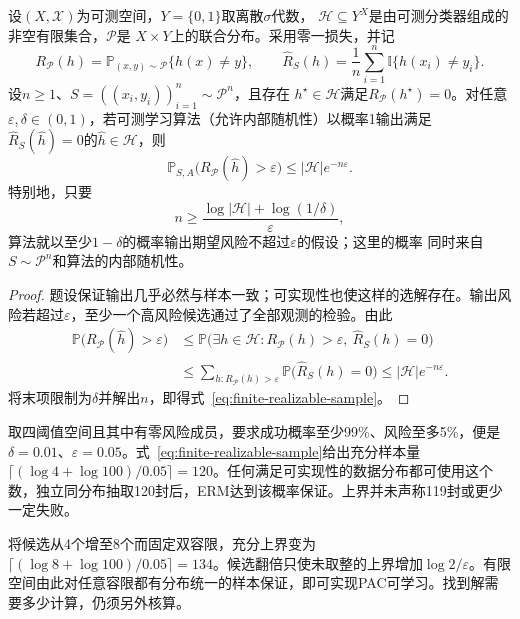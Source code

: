 \begin{theorem}[有限假设空间的可实现PAC样本量界]
\label{thm:finite-realizable-pac}
设$(X,\mathcal X)$为可测空间，$Y=\{0,1\}$取离散$\sigma$代数，
$\mathcal H\subseteq Y^X$是由可测分类器组成的非空有限集合，$\mathcal P$是
$X\times Y$上的联合分布。采用零一损失，并记
\[
 R_{\mathcal P}(h)=\mathbb P_{(x,y)\sim\mathcal P}\{h(x)\neq y\},\qquad
 \hat R_S(h)=\frac1n\sum_{i=1}^n\mathbb I\{h(x_i)\neq y_i\}.
\]
设$n\geq1$、$S=((x_i,y_i))_{i=1}^n\sim\mathcal P^n$，且存在
$h^\star\in\mathcal H$满足$R_{\mathcal P}(h^\star)=0$。对任意
$\varepsilon,\delta\in(0,1)$，若可测学习算法（允许内部随机性）以概率1输出满足
$\hat R_S(\hat h)=0$的$\hat h\in\mathcal H$，则
\begin{equation}
  \mathbb P_{S,A}\bigl(R_{\mathcal P}(\hat h)>\varepsilon\bigr)
  \leq |\mathcal H|e^{-n\varepsilon}.
  \label{eq:finite-realizable-failure}
\end{equation}
特别地，只要
\begin{equation}
  n\geq\frac{\log|\mathcal H|+\log(1/\delta)}{\varepsilon},
  \label{eq:finite-realizable-sample}
\end{equation}
算法就以至少$1-\delta$的概率输出期望风险不超过$\varepsilon$的假设；这里的概率
同时来自$S\sim\mathcal P^n$和算法的内部随机性。
\end{theorem}

\begin{proof}
题设保证输出几乎必然与样本一致；可实现性也使这样的选解存在。输出风险若超过$\varepsilon$，至少一个高风险候选通过了全部观测的检验。由此
\begin{align*}
 \mathbb P\bigl(R_{\mathcal P}(\hat h)>\varepsilon\bigr)
 &\leq \mathbb P\bigl(\exists h\in\mathcal H:
       R_{\mathcal P}(h)>\varepsilon,\ \hat R_S(h)=0\bigr)\\
 &\leq\sum_{h:R_{\mathcal P}(h)>\varepsilon}
       \mathbb P\bigl(\hat R_S(h)=0\bigr)
 \leq |\mathcal H|e^{-n\varepsilon}.
\end{align*}
将末项限制为$\delta$并解出$n$，即得式~\eqref{eq:finite-realizable-sample}。
\end{proof}

取四阈值空间且其中有零风险成员，要求成功概率至少99\%、风险至多5\%，便是$\delta=0.01$、$\varepsilon=0.05$。式~\eqref{eq:finite-realizable-sample}给出充分样本量$\lceil(\log4+\log100)/0.05\rceil=120$。任何满足可实现性的数据分布都可使用这个数，独立同分布抽取120封后，ERM达到该概率保证。上界并未声称119封或更少一定失败。

将候选从4个增至8个而固定双容限，充分上界变为$\lceil(\log8+\log100)/0.05\rceil=134$。候选翻倍只使未取整的上界增加$\log2/\varepsilon$。有限空间由此对任意容限都有分布统一的样本保证，即可实现PAC可学习。找到解需要多少计算，仍须另外核算。

